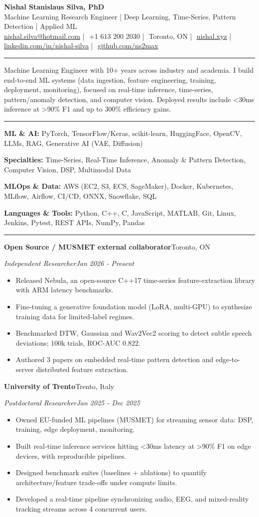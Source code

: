 \documentclass[10pt]{article}
\makeatletter
\newcommand{\contactline}{%
  \href{mailto:nishal.silva@hotmail.com}{nishal.silva@hotmail.com}\SEP
  +1 613 200 2030\SEP
  Toronto, ON\SEP
  \href{https://nishal.xyz}{nishal.xyz}\SEP
  \href{https://www.linkedin.com/in/nishal-silva}{linkedin.com/in/nishal-silva}\SEP
  \href{https://github.com/ns2max}{github.com/ns2max}}
\newcommand{\SEP}{\,\,|\,\,}
\newcommand{\makeheader}{%
  \begin{center}
    {\fontsize{20}{22}\selectfont\bfseries Nishal Stanislaus Silva, PhD}\\[3pt]
    {\cvtagline}\\[2pt]
    {\small \contactline}
  \end{center}\vspace{-9pt}}
\newcommand{\cvsection}[1]{\par\vspace{8pt}{\large\scshape\bfseries #1}\par\vspace{-3pt}\noindent\rule{\linewidth}{0.6pt}\par\vspace{2pt}}
\newcommand{\skillline}[2]{\textbf{#1:} #2\par}
\newenvironment{role}[4]{\par\noindent\textbf{#2}\hfill #3\par\noindent\textit{#1}\hfill\textit{#4}\par
  \begin{itemize}[leftmargin=1.2em,itemsep=0.5pt,parsep=0pt,topsep=1pt,partopsep=0pt,label=\textendash]}
  {\end{itemize}\par\vspace{4pt}}
\newcommand{\cvtagline}{Machine Learning Research Engineer | Deep Learning, Time-Series, Pattern Detection | Applied ML}
\makeatother
\begin{document}
\makeheader

\cvsection{Summary}
Machine Learning Engineer with 10+ years across industry and academia. I build end-to-end ML systems (data ingestion, feature engineering, training, deployment, monitoring), focused on real-time inference, time-series, pattern/anomaly detection, and computer vision. Deployed results include <30ms inference at >90\% F1 and up to 300\% efficiency gains.

\cvsection{Skills}
\skillline{ML \& AI}{PyTorch, TensorFlow/Keras, scikit-learn, HuggingFace, OpenCV, LLMs, RAG, Generative AI (VAE, Diffusion)}
\skillline{Specialties}{Time-Series, Real-Time Inference, Anomaly \& Pattern Detection, Computer Vision, DSP, Multimodal Data}
\skillline{MLOps \& Data}{AWS (EC2, S3, ECS, SageMaker), Docker, Kubernetes, MLflow, Airflow, CI/CD, ONNX, Snowflake, SQL}
\skillline{Languages \& Tools}{Python, C++, C, JavaScript, MATLAB, Git, Linux, Jenkins, Pytest, REST APIs, NumPy, Pandas}

\cvsection{Experience}
\begin{role}{Independent Researcher}{Open Source / MUSMET external collaborator}{Toronto, ON}{Jan 2026 - Present}
  \item Released Nebula, an open-source C++17 time-series feature-extraction library with ARM latency benchmarks.
  \item Fine-tuning a generative foundation model (LoRA, multi-GPU) to synthesize training data for limited-label regimes.
  \item Benchmarked DTW, Gaussian and Wav2Vec2 scoring to detect subtle speech deviations; 100k trials, ROC-AUC 0.822.
  \item Authored 3 papers on embedded real-time pattern detection and edge-to-server distributed feature extraction.
\end{role}

\begin{role}{Postdoctoral Researcher}{University of Trento}{Trento, Italy}{Jan 2025 - Dec 2025}
  \item Owned EU-funded ML pipelines (MUSMET) for streaming sensor data: DSP, training, edge deployment, monitoring.
  \item Built real-time inference services hitting <30ms latency at >90\% F1 on edge devices, with reproducible pipelines.
  \item Designed benchmark suites (baselines + ablations) to quantify architecture/feature trade-offs under compute limits.
  \item Developed a real-time pipeline synchronizing audio, EEG, and mixed-reality tracking streams across 4 concurrent users.
\end{role}
\end{document}
